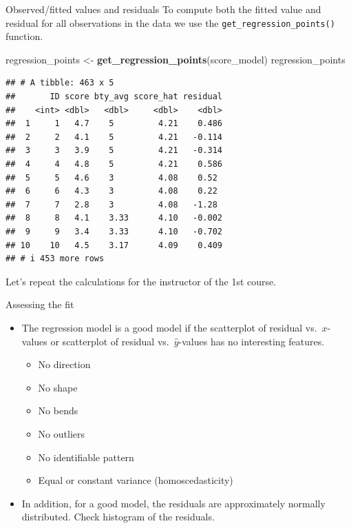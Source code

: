 \documentclass[
  ignorenonframetext,
]{beamer}
\newenvironment{Shaded}{\begin{snugshade}}{\end{snugshade}}
\newcommand{\FunctionTok}[1]{\textcolor[rgb]{0.13,0.29,0.53}{\textbf{#1}}}
\newcommand{\NormalTok}[1]{#1}
\newcommand{\OtherTok}[1]{\textcolor[rgb]{0.56,0.35,0.01}{#1}}
\providecommand{\tightlist}{%
  \setlength{\itemsep}{0pt}\setlength{\parskip}{0pt}}
\begin{document}
\begin{frame}[fragile]{Observed/fitted values and residuals}
\protect\hypertarget{observedfitted-values-and-residuals-2}{}
To compute both the fitted value and residual for all observations in
the data we use the \texttt{get\_regression\_points()} function.

\tiny

\begin{Shaded}
\begin{Highlighting}[]
\NormalTok{regression\_points }\OtherTok{\textless{}{-}} \FunctionTok{get\_regression\_points}\NormalTok{(score\_model)}
\NormalTok{regression\_points}
\end{Highlighting}
\end{Shaded}

\begin{verbatim}
## # A tibble: 463 x 5
##       ID score bty_avg score_hat residual
##    <int> <dbl>   <dbl>     <dbl>    <dbl>
##  1     1   4.7    5         4.21    0.486
##  2     2   4.1    5         4.21   -0.114
##  3     3   3.9    5         4.21   -0.314
##  4     4   4.8    5         4.21    0.586
##  5     5   4.6    3         4.08    0.52 
##  6     6   4.3    3         4.08    0.22 
##  7     7   2.8    3         4.08   -1.28 
##  8     8   4.1    3.33      4.10   -0.002
##  9     9   3.4    3.33      4.10   -0.702
## 10    10   4.5    3.17      4.09    0.409
## # i 453 more rows
\end{verbatim}

\normalsize

Let's repeat the calculations for the instructor of the 1st course.
\end{frame}

\begin{frame}{Assessing the fit}
\protect\hypertarget{assessing-the-fit}{}
\begin{itemize}
\item
  The regression model is a good model if the scatterplot of residual
  vs.~\(x\)-values or scatterplot of residual vs.~\(\hat{y}\)-values has
  no interesting features.

  \begin{itemize}
  \tightlist
  \item
    No direction
  \item
    No shape
  \item
    No bends
  \item
    No outliers
  \item
    No identifiable pattern
  \item
    Equal or constant variance (homoscedasticity)
  \end{itemize}
\item
  In addition, for a good model, the residuals are approximately
  normally distributed. Check histogram of the residuals.
\end{itemize}
\end{frame}
\end{document}
